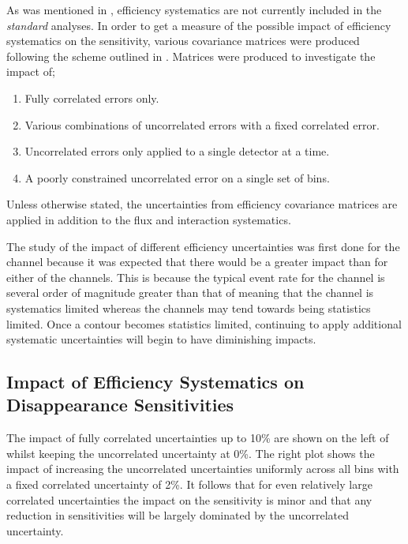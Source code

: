 As was mentioned in , efficiency systematics are not currently included in the \textit{standard} analyses. In order to get a measure of the possible impact of efficiency systematics on the sensitivity, various covariance matrices were produced following the scheme outlined in . Matrices were produced to investigate the impact of;
\begin{enumerate}
    \item Fully correlated errors only.
    \item Various combinations of uncorrelated errors with a fixed correlated error.
    \item Uncorrelated errors only applied to a single detector at a time.
    \item A poorly constrained uncorrelated error on a single set of bins.
\end{enumerate}
Unless otherwise stated, the uncertainties from efficiency covariance matrices are applied in addition to the flux and interaction systematics. 

The study of the impact of different efficiency uncertainties was first done for the \numu channel because it was expected that there would be a greater impact than for either of the \nue channels. This is because the typical event rate for the \numu channel is several order of magnitude greater than that of \nue meaning that the \numu channel is systematics limited whereas the \nue channels may tend towards being statistics limited. Once a contour becomes statistics limited, continuing to apply additional systematic uncertainties will begin to have diminishing impacts. 

\subsection{\texorpdfstring{Impact of Efficiency Systematics on \numu Disappearance Sensitivities}{Impact of Efficiency Systematics on numu Disappearance Sensitivities}}


The impact of fully correlated uncertainties up to 10\% are shown on the left of  whilst keeping the uncorrelated uncertainty at 0\%. The right plot shows the impact of increasing the uncorrelated uncertainties uniformly across all bins with a fixed correlated uncertainty of 2\%. It follows that for even relatively large correlated uncertainties the impact on the sensitivity is minor and that any reduction in sensitivities will be largely dominated by the uncorrelated uncertainty. 

